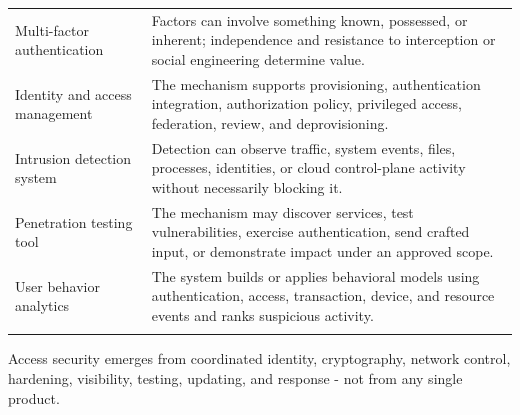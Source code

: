 \documentclass[11pt]{article}
\begin{document}
\begin{longtable}{@{}>{\RaggedRight\arraybackslash}p{}>{\RaggedRight\arraybackslash}p{}@{}}
Multi-factor authentication & Factors can involve something known, possessed, or inherent; independence and resistance to interception or social engineering determine value. \\\addlinespace[2pt]
Identity and access management & The mechanism supports provisioning, authentication integration, authorization policy, privileged access, federation, review, and deprovisioning. \\\addlinespace[2pt]
Intrusion detection system & Detection can observe traffic, system events, files, processes, identities, or cloud control-plane activity without necessarily blocking it. \\\addlinespace[2pt]
Penetration testing tool & The mechanism may discover services, test vulnerabilities, exercise authentication, send crafted input, or demonstrate impact under an approved scope. \\\addlinespace[2pt]
User behavior analytics & The system builds or applies behavioral models using authentication, access, transaction, device, and resource events and ranks suspicious activity. \\\addlinespace[2pt]
\bottomrule
\end{longtable}
\begin{takeawaybox}
Access security emerges from coordinated identity, cryptography, network control, hardening, visibility, testing, updating, and response - not from any single product.
\end{takeawaybox}
\end{document}
